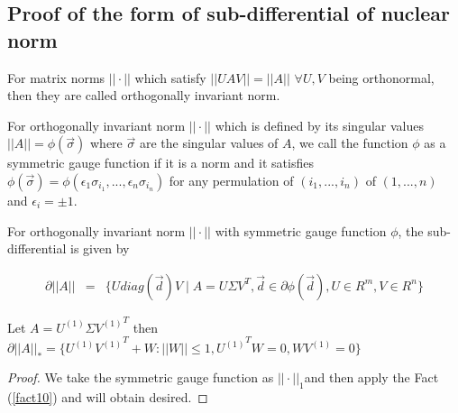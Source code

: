 \subsection{Proof of the form of sub-differential of nuclear norm }
\begin{definition}
For matrix norms $||\cdot||$ which satisfy $||UAV||=||A||$ $\forall U,V$ being orthonormal, then they are called orthogonally invariant norm. 

\begin{definition}
For orthogonally invariant norm $||\cdot||$ which is defined by its singular values $||A||=\phi(\vec{\sigma})$ where $\vec{\sigma}$ are the singular values of $A$, we call the function $\phi$ as a symmetric gauge function if it is a norm and it satisfies $\phi(\vec{\sigma})=\phi(\epsilon_{1}\sigma_{i_{1}},...,\epsilon_{n}\sigma_{i_{n}})$ for any permulation of $(i_{1},...,i_{n})$ of $(1,...,n)$ and $\epsilon_{i}=\pm1$.

\begin{fact}
\label{fact10}
For orthogonally invariant norm $||\cdot||$ with symmetric
gauge function $\phi$, the sub-differential is given by

\begin{eqnarray*}
\partial||A|| & = & \{Udiag(\vec{d})V\mid A=U\Sigma V^{T},\vec{d}\in\partial\phi(\vec{d}),U\in R^{m},V\in R^{n}\}
\end{eqnarray*}

\end{fact}
\end{definition}
\end{definition}

\begin{thm}
Let $A=U^{(1)}\Sigma{V^{(1)}}^{T}$ then $\partial||A||_{*}=\{U^{(1)}{V^{(1)}}^{T}+W:||W||\le1,{U^{(1)}}^{T}W=0,WV^{(1)}=0\}$ 
\end{thm}

\begin{proof}
We take the symmetric gauge function as $||\cdot||_{1}$and then apply the Fact (\ref{fact10}) and will obtain desired.
\end{proof}

